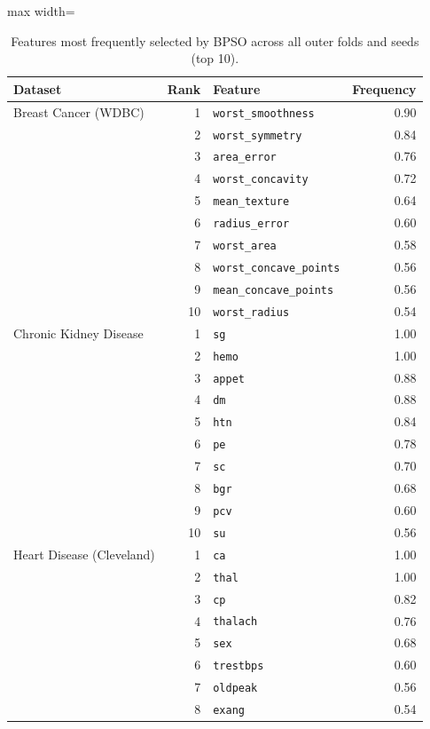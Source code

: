 \begin{table}[!t]
\centering
\caption{Features most frequently selected by BPSO across all outer folds and seeds (top 10).}
\label{tab:top_features}
\footnotesize
\setlength{\tabcolsep}{4pt}
\begin{adjustbox}{max width=\linewidth}
\begin{tabular}{lrlr}
\toprule
\textbf{Dataset} & \textbf{Rank} & \textbf{Feature} & \textbf{Frequency} \\
\midrule
Breast Cancer (WDBC) & 1 & \texttt{worst\_smoothness} & 0.90 \\
 & 2 & \texttt{worst\_symmetry} & 0.84 \\
 & 3 & \texttt{area\_error} & 0.76 \\
 & 4 & \texttt{worst\_concavity} & 0.72 \\
 & 5 & \texttt{mean\_texture} & 0.64 \\
 & 6 & \texttt{radius\_error} & 0.60 \\
 & 7 & \texttt{worst\_area} & 0.58 \\
 & 8 & \texttt{worst\_concave\_points} & 0.56 \\
 & 9 & \texttt{mean\_concave\_points} & 0.56 \\
 & 10 & \texttt{worst\_radius} & 0.54 \\
Chronic Kidney Disease & 1 & \texttt{sg} & 1.00 \\
 & 2 & \texttt{hemo} & 1.00 \\
 & 3 & \texttt{appet} & 0.88 \\
 & 4 & \texttt{dm} & 0.88 \\
 & 5 & \texttt{htn} & 0.84 \\
 & 6 & \texttt{pe} & 0.78 \\
 & 7 & \texttt{sc} & 0.70 \\
 & 8 & \texttt{bgr} & 0.68 \\
 & 9 & \texttt{pcv} & 0.60 \\
 & 10 & \texttt{su} & 0.56 \\
Heart Disease (Cleveland) & 1 & \texttt{ca} & 1.00 \\
 & 2 & \texttt{thal} & 1.00 \\
 & 3 & \texttt{cp} & 0.82 \\
 & 4 & \texttt{thalach} & 0.76 \\
 & 5 & \texttt{sex} & 0.68 \\
 & 6 & \texttt{trestbps} & 0.60 \\
 & 7 & \texttt{oldpeak} & 0.56 \\
 & 8 & \texttt{exang} & 0.54 \\

\end{tabular}
\end{adjustbox}
\end{table}
